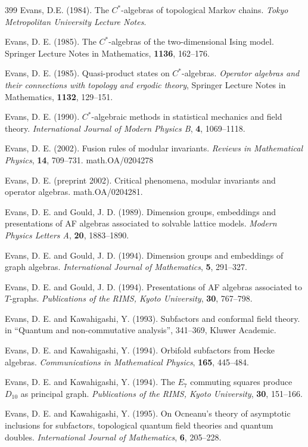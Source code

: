 \documentclass[12pt]{article}
\theoremstyle{plain}
\theoremstyle{definition}
\numberwithin{equation}{section}
\begin{document}
\begin{thebibliography} {399}
Evans, D.E. (1984).
The $C^*$-algebras of topological Markov chains.
{\em Tokyo Metropolitan University Lecture Notes}.

Evans, D. E. (1985).
The $C^*$-algebras of the two-dimensional Ising model.
Springer Lecture Notes in Mathematics, {\bf 1136}, 162--176.

Evans, D. E. (1985).
Quasi-product states on $C^*$-algebras.
{\em Operator algebras and their connections with 
topology and ergodic theory}, 
Springer Lecture Notes in Mathematics, {\bf 1132}, 129--151.

Evans, D. E. (1990).
$C^*$-algebraic methods in
statistical mechanics and field theory.
{\em International Journal of Modern Physics B},
{\bf 4}, 1069--1118.

Evans, D. E. (2002).
Fusion rules of modular invariants.
{\em Reviews in Mathematical Physics}, {\bf 14}, 709--731.
math.OA/0204278

Evans, D. E. (preprint 2002).
Critical phenomena, modular invariants and operator algebras.
math.OA/0204281.

Evans, D. E. and Gould, J. D. (1989).
Dimension groups, embeddings and presentations of  
AF algebras associated to solvable lattice models.
{\em Modern Physics Letters A}, {\bf 20}, 1883--1890.

Evans, D. E. and Gould, J. D. (1994).
Dimension groups and embeddings of graph algebras.
{\em International Journal of Mathematics},
{\bf 5}, 291--327.

Evans, D. E. and Gould, J. D. (1994).
Presentations of AF algebras associated to $T$-graphs.
{\em Publications of the RIMS, Kyoto University}, {\bf 30}, 767--798.

Evans, D. E. and Kawahigashi, Y. (1993).
Subfactors and conformal field theory.
in ``Quantum and non-commutative analysis'', 
341--369, Kluwer Academic.

Evans, D. E. and Kawahigashi, Y. (1994).
Orbifold subfactors from Hecke algebras.
{\em Communications in Mathematical Physics},
{\bf 165}, 445--484.

Evans, D. E. and Kawahigashi, Y. (1994).
The $E_7$ commuting squares produce
$D_{10}$ as principal graph.
{\em Publications of the RIMS, Kyoto University},
{\bf 30}, 151--166.

Evans, D. E. and Kawahigashi, Y. (1995).
On Ocneanu's theory of asymptotic inclusions for 
subfactors, topological quantum field theories
and quantum doubles.
{\em International Journal of Mathematics},
{\bf 6}, 205--228.


\end{thebibliography}
\end{document}
